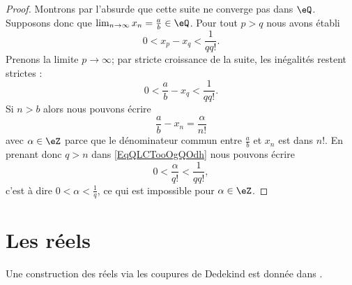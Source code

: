 \begin{proof}
    Montrons par l'absurde que cette suite ne converge pas dans \( \eQ\). Supposons donc que \( \lim_{n\to \infty} x_n=\frac{ a }{b }\in \eQ\). Pour tout \( p>q\) nous avons établi
    \begin{equation}
        0<x_p-x_q<\frac{1}{ qq! }.
    \end{equation}
    Prenons la limite \( p\to \infty\); par stricte croissance de la suite, les inégalités restent strictes :
    \begin{equation}        \label{EqQLCTooOgQOdh}
        0<\frac{ a }{ b }-x_q<\frac{1}{ qq! }.
    \end{equation}
    Si \( n>b\) alors nous pouvons écrire
    \begin{equation}
        \frac{ a }{ b }-x_n=\frac{ \alpha }{ n! }
    \end{equation}
    avec \( \alpha\in \eZ\) parce que le dénominateur commun entre \( \frac{ a }{ b }\) et \( x_n\) est dans \( n!\). En prenant donc \( q>n\) dans \eqref{EqQLCTooOgQOdh} nous pouvons écrire
    \begin{equation}
        0<\frac{ \alpha }{ q! }<\frac{1}{ qq! },
    \end{equation}
    c'est à dire \( 0<\alpha<\frac{1}{ q }\), ce qui est impossible pour \( \alpha\in \eZ\).
\end{proof}

\section{Les réels}

Une construction des réels via les coupures de Dedekind est donnée dans \cite{PaulinTopGmVegN}.

